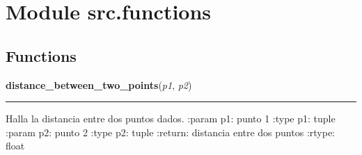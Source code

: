 %
%
%


\section{Module src.functions}

    \label{src:functions}


  \subsection{Functions}

    \label{src:functions:distance_between_two_points}

    \vspace{0.5ex}

\hspace{.8\funcindent}\begin{boxedminipage}{\funcwidth}

    \raggedright \textbf{distance\_between\_two\_points}(\textit{p1}, \textit{p2})

    \vspace{-1.5ex}

    \rule{\textwidth}{0.5\fboxrule}
\setlength{\parskip}{2ex}

Halla la distancia entre dos puntos dados.
:param p1: punto 1
:type p1: tuple
:param p2: punto 2
:type p2: tuple
:return: distancia entre dos puntos
:rtype: float
\setlength{\parskip}{1ex}
    \end{boxedminipage}

    \label{src:functions:direction_between_two_points}

